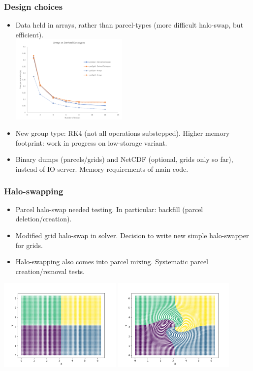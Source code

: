 \documentclass{beamer}
\begin{document}
\begin{frame}
\frametitle{Design choices}
\begin{itemize}
\item Data held in arrays, rather than parcel-types (more difficult halo-swap, but efficient). \\
\includegraphics[width=0.45\textwidth]{pmpic_images/grid2par.png} 
\item New group type: RK4 (not all operations substepped). \newline Higher memory footprint: work in progress on low-storage variant.
\item Binary dumps (parcels/grids) and NetCDF (optional, grids only so far), instead of IO-server. Memory requirements of main code.
\end{itemize}

\end{frame}

\begin{frame}
\frametitle{Halo-swapping}
\begin{itemize}
\item Parcel halo-swap needed testing. \newline In particular: backfill (parcel deletion/creation).
\item Modified grid halo-swap in solver. Decision to write new simple halo-swapper for grids. 
\item Halo-swapping also comes into parcel mixing. Systematic parcel creation/removal tests.
\end{itemize}

\vspace{-0.3cm}
\includegraphics[width=0.45\textwidth]{pmpic_images/vel0.png} 
\includegraphics[width=0.45\textwidth]{pmpic_images/vel1.png} 

\end{frame}
\end{document}
